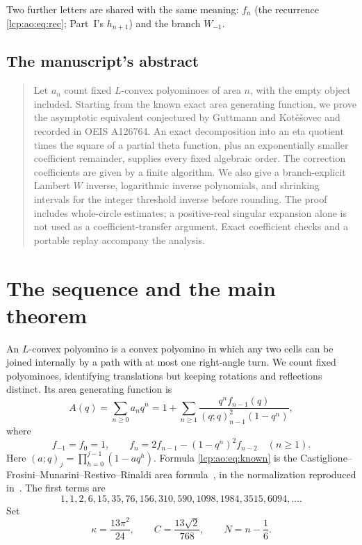 \documentclass[11pt]{article}
\numberwithin{equation}{section}
\theoremstyle{definition}\newtheorem{definition}[theorem]{Definition}
\theoremstyle{remark}\newtheorem{remark}[theorem]{Remark}
\begin{document}
Two further letters are shared with the same meaning: $f_n$ (the
recurrence \eqref{lcp:ao:eq:rec}; Part~I's $h_{n+1}$) and the branch
$W_{-1}$.

\subsection{The manuscript's abstract}
\begin{quote}\small
Let $a_n$ count fixed $L$-convex polyominoes of area $n$, with the empty object included. Starting from the known exact area generating function, we prove the asymptotic equivalent conjectured by Guttmann and Kot\v{e}\v{s}ovec and recorded in OEIS A126764. An exact decomposition into an eta quotient times the square of a partial theta function, plus an exponentially smaller coefficient remainder, supplies every fixed algebraic order. The correction coefficients are given by a finite algorithm. We also give a branch-explicit Lambert $W$ inverse, logarithmic inverse polynomials, and shrinking intervals for the integer threshold inverse before rounding. The proof includes whole-circle estimates; a positive-real singular expansion alone is not used as a coefficient-transfer argument. Exact coefficient checks and a portable replay accompany the analysis.
\end{quote}

\section{The sequence and the main theorem}\label{lcp:ao:sec:main}
An $L$-convex polyomino is a convex polyomino in which any two cells can be joined internally by a path with at most one right-angle turn. We count fixed polyominoes, identifying translations but keeping rotations and reflections distinct. Its area generating function is
\begin{equation}\label{lcp:ao:eq:known}
 A(q)=\sum_{n\ge0}a_nq^n
 =1+\sum_{n\ge1}\frac{q^n f_{n-1}(q)}{(q;q)_{n-1}^2(1-q^n)},
\end{equation}
where
\begin{equation}\label{lcp:ao:eq:rec}
 f_{-1}=f_0=1,\qquad f_n=2f_{n-1}-(1-q^n)^2f_{n-2}\quad(n\ge1).
\end{equation}
Here $(a;q)_j=\prod_{h=0}^{j-1}(1-aq^h)$. Formula \eqref{lcp:ao:eq:known} is the Castiglione--Frosini--Munarini--Restivo--Rinaldi area formula~\cite{castiglione}, in the normalization reproduced in~\cite[Eq.~(1.1)]{gk}. The first terms are
\[
1,1,2,6,15,35,76,156,310,590,1098,1984,3515,6094,\ldots.
\]
Set
\begin{equation}\label{lcp:ao:eq:constants}
 \kappa=\frac{13\pi^2}{24},\qquad C=\frac{13\sqrt2}{768},\qquad N=n-\frac16.
\end{equation}
\end{document}

